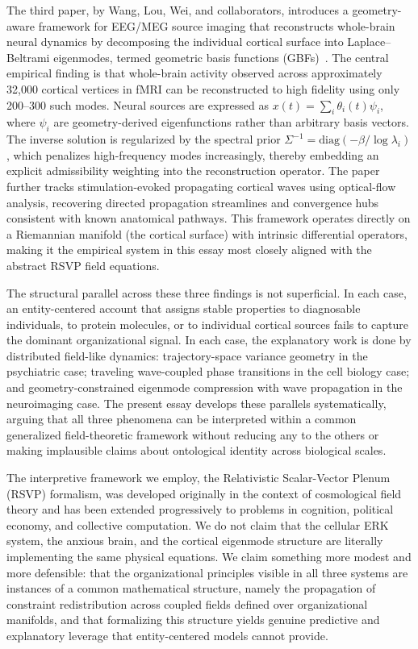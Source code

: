 \documentclass[11pt,a4paper]{article}
\theoremstyle{plain}
\theoremstyle{definition}
\begin{document}
The third paper, by Wang, Lou, Wei, and collaborators, introduces a geometry-aware
framework for EEG/MEG source imaging that reconstructs whole-brain neural dynamics
by decomposing the individual cortical surface into Laplace--Beltrami eigenmodes,
termed geometric basis functions (GBFs)~\cite{Wang2026}. The central empirical finding
is that whole-brain activity observed across approximately 32,000 cortical vertices in
fMRI can be reconstructed to high fidelity using only 200--300 such modes. Neural
sources are expressed as $x(t) = \sum_i \theta_i(t)\psi_i$, where $\psi_i$ are
geometry-derived eigenfunctions rather than arbitrary basis vectors. The inverse
solution is regularized by the spectral prior
$\Sigma^{-1} = \mathrm{diag}(-\beta/\log\lambda_i)$, which penalizes high-frequency
modes increasingly, thereby embedding an explicit admissibility weighting into the
reconstruction operator. The paper further tracks stimulation-evoked propagating cortical
waves using optical-flow analysis, recovering directed propagation streamlines and
convergence hubs consistent with known anatomical pathways. This framework operates
directly on a Riemannian manifold (the cortical surface) with intrinsic differential
operators, making it the empirical system in this essay most closely aligned with the
abstract RSVP field equations.

The structural parallel across these three findings is not superficial. In each case,
an entity-centered account that assigns stable properties to diagnosable individuals,
to protein molecules, or to individual cortical sources fails to capture the dominant
organizational signal. In each case, the explanatory work is done by distributed
field-like dynamics: trajectory-space variance geometry in the psychiatric case;
traveling wave-coupled phase transitions in the cell biology case; and geometry-constrained
eigenmode compression with wave propagation in the neuroimaging case. The present essay
develops these parallels systematically, arguing that all three phenomena can be
interpreted within a common generalized field-theoretic framework without reducing
any to the others or making implausible claims about ontological identity across
biological scales.

The interpretive framework we employ, the Relativistic Scalar-Vector Plenum (RSVP)
formalism, was developed originally in the context of cosmological field theory and has
been extended progressively to problems in cognition, political economy, and collective
computation. We do not claim that the cellular ERK system, the anxious brain, and the
cortical eigenmode structure are literally implementing the same physical equations.
We claim something more modest and more defensible: that the organizational principles
visible in all three systems are instances of a common mathematical structure, namely
the propagation of constraint redistribution across coupled fields defined over
organizational manifolds, and that formalizing this structure yields genuine predictive
and explanatory leverage that entity-centered models cannot provide.
\end{document}
